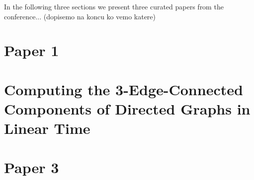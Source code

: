 \documentclass[
	a4paper, %
	10pt, %
	unnumberedsections, %
	twoside, %
]{LTJournalArticle}
\begin{document}
In the following three sections we present three curated papers from the conference... (dopisemo na koncu ko vemo katere)


\section{Paper 1}



\section{Computing the 3-Edge-Connected Components of Directed Graphs in Linear Time}




\section{Paper 3}




\printbibliography %

\end{document}
